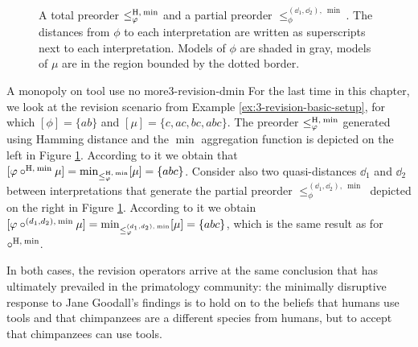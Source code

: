 \begin{figure}
	\caption{
		A total preorder $\le^{{\operatorname{H}},\:{\operatorname{min}}}_\varphi$ 
		and a partial preorder $\le^{(\dd_{1},\dd_{2}),\:\min}_\phi$. 
		The distances from $\phi$ to each interpretation are written as superscripts next to each interpretation.
		Models of $\phi$ are shaded in gray, models of $\mu$ are in the region bounded by the dotted border. 
	}
	\label{fig:3-revision-dalal-partial}
\end{figure}

\begin{xmpl}{A monopoly on tool use no more}{3-revision-dmin}
	For the last time in this chapter, we look at the revision scenario from 
	Example \ref{ex:3-revision-basic-setup},
	for which $[\phi]=\{ab\}$ and $[\mu]=\{c,ac,bc,abc\}$.
	The preorder $\le_\varphi^{{\operatorname{H}},\:{\operatorname{min}}}$ generated 
	using Hamming distance and 
	the $\min$ aggregation function is depicted 
	on the left in Figure \ref{fig:3-revision-dalal-partial}.
	According to it we obtain that $[\varphi\circ^{{\operatorname{H}},\:{\operatorname{min}}}\mu]={\operatorname{min}}_{\le^{{\operatorname{H}},\:{\operatorname{min}}}_\varphi}[\mu]=\{abc\}$.
	Consider also 
	two quasi-distances $\dd_{1}$ and $\dd_{2}$ between interpretations that generate
	the partial preorder $\le_\phi^{(\dd_{1},\dd_{2}),\:\min}$ depicted on the right 
	in Figure \ref{fig:3-revision-dalal-partial}. 
	According to it we obtain 
	$[\varphi\circ^{(d_{1},d_{2}),\:{\operatorname{min}}}\mu]={\operatorname{min}}_{\le^{(d_{1},d_{2}),\:{\operatorname{min}}}_\varphi}[\mu]=\{abc\}$,
	which is the same result as for $\circ^{{\operatorname{H}},\:{\operatorname{min}}}$.

	In both cases, the revision operators arrive at the same conclusion
	that has ultimately prevailed in the primatology community: 
	the minimally disruptive response to Jane Goodall's findings is to 
	hold on to the beliefs that humans use tools and that chimpanzees are a different
	species from humans,
	but to accept that chimpanzees can use tools.
\end{xmpl}

